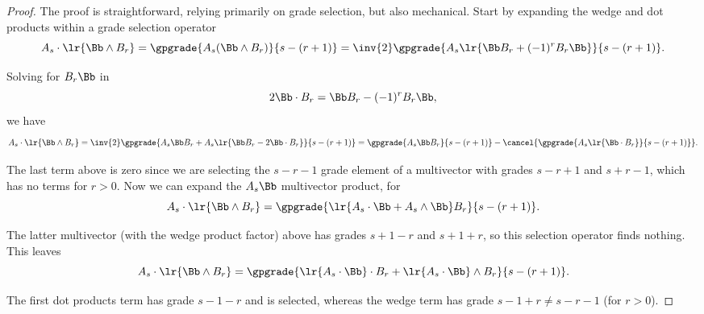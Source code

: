 %
%
\begin{proof}
The proof is straightforward, relying primarily on grade selection, but also mechanical.
Start by expanding the wedge and dot products within a grade selection operator
\begin{dmath}\label{eqn:wedgeDistributionIdentityProblemsWedgeDistributionIdentityProof:1460}
A_s \cdot \lr{ \Bb \wedge B_r }
=
\gpgrade{A_s (\Bb \wedge B_r)}{s - (r + 1)}
=
\inv{2} \gpgrade{A_s \lr{\Bb B_r + (-1)^{r} B_r \Bb} }{s - (r + 1)}.
\end{dmath}

Solving for \(B_r \Bb\) in
\begin{equation}\label{eqn:wedgeDistributionIdentityProblemsWedgeDistributionIdentityProof:1480}
2 \Bb \cdot B_r = \Bb B_r - (-1)^{r} B_r \Bb,
\end{equation}
we have
\begin{dmath}\label{eqn:wedgeDistributionIdentityProblemsWedgeDistributionIdentityProof:1500}
A_s \cdot \lr{ \Bb \wedge B_r }
=
\inv{2} \gpgrade{ A_s \Bb B_r + A_s \lr{ \Bb B_r - 2 \Bb \cdot B_r } }{s - (r + 1)}
=
\gpgrade{ A_s \Bb B_r }{s - (r + 1)}
-
\cancel{\gpgrade{ A_s \lr{ \Bb \cdot B_r } }{s - (r + 1)}}.
\end{dmath}

The last term above is zero since we are selecting the \(s - r - 1\) grade element of a multivector with grades \(s - r + 1\) and \(s + r - 1\), which has no terms for \(r > 0\).
Now we can expand the \(A_s \Bb\) multivector product, for
\begin{dmath}\label{eqn:wedgeDistributionIdentityProblemsWedgeDistributionIdentityProof:1520}
A_s \cdot \lr{ \Bb \wedge B_r }
=
\gpgrade{ \lr{ A_s \cdot \Bb + A_s \wedge \Bb} B_r }{s - (r + 1)}.
\end{dmath}

The latter multivector (with the wedge product factor) above has grades \(s + 1 - r\) and \(s + 1 + r\), so this selection operator finds nothing.
This leaves
\begin{dmath}\label{eqn:wedgeDistributionIdentityProblemsWedgeDistributionIdentityProof:1540}
A_s \cdot \lr{ \Bb \wedge B_r }
=
\gpgrade{
\lr{ A_s \cdot \Bb } \cdot B_r
+ \lr{ A_s \cdot \Bb } \wedge B_r
}{s - (r + 1)}.
\end{dmath}

The first dot products term has grade \(s - 1 - r\) and is selected, whereas the wedge term has grade \(s - 1 + r \ne s - r - 1\) (for \(r > 0\)).
\end{proof}


